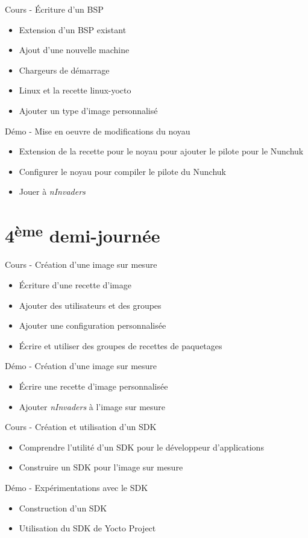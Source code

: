 \documentclass[a4paper,12pt,obeyspaces,spaces,hyphens]{article}
\begin{document}
\feagendatwocolumn
{Cours - Écriture d'un BSP}
{
  \begin{itemize}
  \item Extension d'un BSP existant
  \item Ajout d'une nouvelle machine
  \item Chargeurs de démarrage
  \item Linux et la recette linux-yocto
  \item Ajouter un type d'image personnalisé
  \end{itemize}
}
{Démo - Mise en oeuvre de modifications du noyau}
{
  \begin{itemize}
  \item Extension de la recette pour le noyau pour ajouter le pilote
        pour le Nunchuk
  \item Configurer le noyau pour compiler le pilote du Nunchuk
  \item Jouer à {\em nInvaders}
  \end{itemize}
}

\section{4\textsuperscript{ème} demi-journée}

\feagendatwocolumn
{Cours - Création d'une image sur mesure}
{
  \begin{itemize}
  \item Écriture d'une recette d'image
  \item Ajouter des utilisateurs et des groupes
  \item Ajouter une configuration personnalisée
  \item Écrire et utiliser des groupes de recettes de paquetages
  \end{itemize}
}
{Démo - Création d'une image sur mesure}
{
  \begin{itemize}
  \item Écrire une recette d'image personnalisée
  \item Ajouter {\em nInvaders} à l'image sur mesure
  \end{itemize}
}
\feagendatwocolumn
{Cours - Création et utilisation d'un SDK}
{
  \begin{itemize}
  \item Comprendre l'utilité d'un SDK pour le développeur d'applications
  \item Construire un SDK pour l'image sur mesure
  \end{itemize}
}
{Démo - Expérimentations avec le SDK}
{
  \begin{itemize}
  \item Construction d'un SDK
  \item Utilisation du SDK de Yocto Project
  \end{itemize}
}
\end{document}
